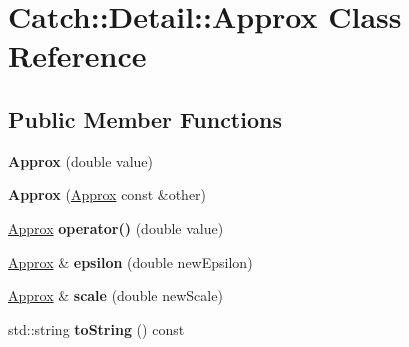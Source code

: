 \hypertarget{class_catch_1_1_detail_1_1_approx}{}\section{Catch\+:\+:Detail\+:\+:Approx Class Reference}
\label{class_catch_1_1_detail_1_1_approx}
\subsection*{Public Member Functions}
\begin{DoxyCompactItemize}
\item 
\hypertarget{class_catch_1_1_detail_1_1_approx_a1a8618ea8db08c66bd3d9fe8f74b957a}{}{\bfseries Approx} (double value)\label{class_catch_1_1_detail_1_1_approx_a1a8618ea8db08c66bd3d9fe8f74b957a}

\item 
\hypertarget{class_catch_1_1_detail_1_1_approx_a807330c63266fc914abdf6e461255a54}{}{\bfseries Approx} (\hyperlink{class_catch_1_1_detail_1_1_approx}{Approx} const \&other)\label{class_catch_1_1_detail_1_1_approx_a807330c63266fc914abdf6e461255a54}

\item 
\hypertarget{class_catch_1_1_detail_1_1_approx_a48c9cbc28a05dc9dc8c3973b9eae2268}{}\hyperlink{class_catch_1_1_detail_1_1_approx}{Approx} {\bfseries operator()} (double value)\label{class_catch_1_1_detail_1_1_approx_a48c9cbc28a05dc9dc8c3973b9eae2268}

\item 
\hypertarget{class_catch_1_1_detail_1_1_approx_a05c50c3ad0a971fab19345b5d94979a9}{}\hyperlink{class_catch_1_1_detail_1_1_approx}{Approx} \& {\bfseries epsilon} (double new\+Epsilon)\label{class_catch_1_1_detail_1_1_approx_a05c50c3ad0a971fab19345b5d94979a9}

\item 
\hypertarget{class_catch_1_1_detail_1_1_approx_acd80f0737bf38112beacd5ca95bef113}{}\hyperlink{class_catch_1_1_detail_1_1_approx}{Approx} \& {\bfseries scale} (double new\+Scale)\label{class_catch_1_1_detail_1_1_approx_acd80f0737bf38112beacd5ca95bef113}

\item 
\hypertarget{class_catch_1_1_detail_1_1_approx_adeb74b73506b3f6b2ba72aea15168fbe}{}std\+::string {\bfseries to\+String} () const \label{class_catch_1_1_detail_1_1_approx_adeb74b73506b3f6b2ba72aea15168fbe}

\end{DoxyCompactItemize}
